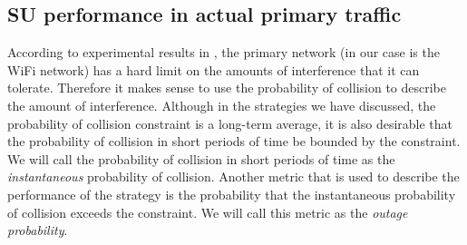 \documentclass[10pt,final,journal,letterpaper]{IEEEtran}
\begin{document}
\subsection{SU performance in actual primary traffic}
According to experimental results in \cite{kundargi2010protomac}, the primary network (in our case is the WiFi network) has a hard limit on the amounts of interference that it can tolerate. Therefore it makes sense to use the probability of collision to describe the amount of interference. Although in the strategies we have discussed, the probability of collision constraint is a long-term average, it is also desirable that the probability of collision in short periods of time be bounded by the constraint. We will call the probability of collision in short periods of time as the \emph{instantaneous} probability of collision. Another metric that is used to describe the performance of the strategy is the probability that the instantaneous probability of collision exceeds the constraint. We will call this metric as the \emph{outage probability}.
\end{document}
